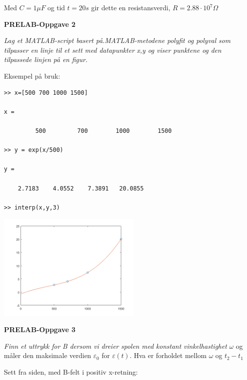 \documentclass[a4paper,norsk,12pt]{article}
\begin{document}
Med $C = 1\mu F$ og tid $t=20s$ gir dette en resistansverdi, $ R = 2.88 \cdot 10^7 \Omega $

\newpage

\noindent
\textbf{PRELAB-Oppgave 2}

\noindent
\textit{Lag et MATLAB-script basert på.MATLAB-metodene polyfit og polyval som tilpasser en linje til et sett med datapunkter x,y og viser punktene og den tilpassede linjen på en figur.}



\vspace{3mm}

Eksempel på bruk:

\begin{verbatim}
>> x=[500 700 1000 1500]

x =

         500         700        1000        1500

>> y = exp(x/500)

y =

    2.7183    4.0552    7.3891   20.0855
    
>> interp(x,y,3)  
\end{verbatim}

\includegraphics[width=70mm]{polyval.png}\\

\vspace{3mm}

\newpage

\noindent
\textbf{PRELAB-Oppgave 3}

\noindent
\textit{Finn et uttrykk for \textit{B} dersom vi dreier spolen med konstant vinkelhastighet $\omega$} og måler den maksimale verdien $\varepsilon_0$ for $\varepsilon(t)$. Hva er forholdet mellom $\omega$ og $t_2-t_1$

\vspace{3mm}

Sett fra siden, med B-felt i positiv x-retning:
\end{document}

